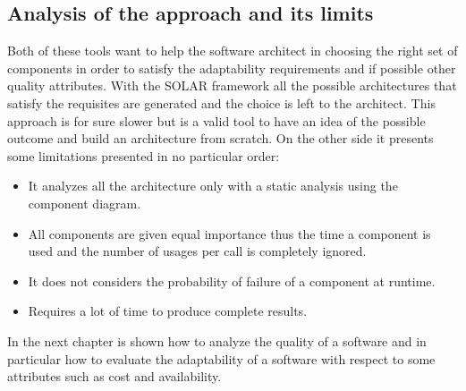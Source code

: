 \subsection{Analysis of the approach and its limits}
Both of these tools want to help the software architect in choosing the right set of components in order to satisfy the adaptability requirements and if possible other quality attributes. With the SOLAR framework all the possible architectures that satisfy the requisites are generated and the choice is left to the architect. This approach is for sure slower but is a valid tool to have an idea of the possible outcome and build an architecture from scratch. On the other side it presents some limitations presented in no particular order:
\begin{itemize}
	\item It analyzes all the architecture only with a static analysis using the component diagram.
	\item All components are given equal importance thus the time a component is used and the number of usages per call is completely ignored.
	\item It does not considers the probability of failure of a component at runtime.
	\item Requires a lot of time to produce complete results.
\end{itemize}
In the next chapter is shown how to analyze the quality of a software and in particular how to evaluate the adaptability of a software with respect to some attributes such as cost and availability.